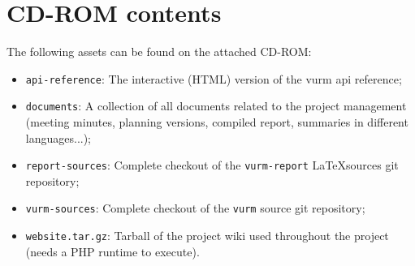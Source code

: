 \chapter{CD-ROM contents}

The following assets can be found on the attached CD-ROM:

\begin{itemize}
	\item \texttt{api-reference}: The interactive (HTML) version of the \gls{vurm} \gls{api} reference;
	\item \texttt{documents}: A collection of all documents related to the project management (meeting minutes, planning versions, compiled report, summaries in different languages...);
	\item \texttt{report-sources}: Complete checkout of the \texttt{vurm-report} \LaTeX sources git repository;
	\item \texttt{vurm-sources}: Complete checkout of the \texttt{vurm} source git repository;
	\item \texttt{website.tar.gz}: Tarball of the project wiki used throughout the project (needs a PHP runtime to execute).
\end{itemize}


